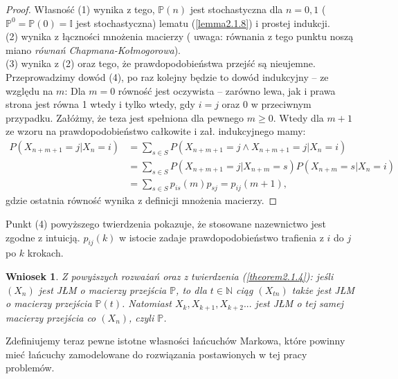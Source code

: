 \documentclass[a4paper]{article}
\theoremstyle{defn}
\theoremstyle{theorem}
\theoremstyle{lemma}
\theoremstyle{cor}
\newtheorem{cor}[defn]{Wniosek}
\theoremstyle{fact}
\begin{document}
\begin{proof}
Własność (1) wynika z tego, $\mathbb{P}(n)$ jest stochastyczna dla $n= 0,1$ ($\mathbb{P}^0 = \mathbb{P}(0) = \mathbb{I}$ jest stochastyczna) lematu (\ref{lemma2.1.8}) i prostej indukcji.
\\(2) wynika z łączności mnożenia macierzy ( uwaga: równania z tego punktu noszą miano \textit{równań Chapmana-Kołmogorowa}). \\
(3) wynika z (2) oraz tego, że prawdopodobieństwa przejść są nieujemne.\\
Przeprowadzimy dowód (4), po raz kolejny będzie to dowód indukcyjny – ze względu na $m$:
Dla $m=0$ równość jest oczywista – zarówno lewa, jak i prawa strona jest równa 1 wtedy i tylko wtedy, gdy $i = j$ oraz 0 w przeciwnym przypadku. Załóżmy, że teza jest spełniona dla pewnego $m \geq 0$. Wtedy dla $m+1$ ze wzoru na prawdopodobieństwo całkowite i zał. indukcyjnego mamy: \begin{align*}
    P(X_{n+m+1}=j|X_n = i) &= \sum\limits_{s \in S} P(X_{n+m+1}=j \land X_{n+m+1}=j |X_n = i) \\
    &= \sum\limits_{s \in S} P(X_{n+m+1}=j | X_{n+m}=s)P(X_{n+m}=s|X_n = i) \\
    &= \sum\limits_{s \in S} p_{is}(m)p_{sj} = p_{ij}(m+1),
\end{align*}
gdzie ostatnia równość wynika z definicji mnożenia macierzy.
\end{proof}
Punkt (4) powyższego twierdzenia pokazuje, że stosowane nazewnictwo jest zgodne z intuicją. $p_{ij}(k)$ w istocie zadaje prawdopodobieństwo trafienia z $i$ do $j$ po $k$ krokach.

\begin{cor}\label{cor2.1.14}
Z powyższych rozważań oraz z twierdzenia (\ref{theorem2.1.4}): jeśli $(X_n)$ jest JŁM o macierzy przejścia $\mathbb{P}$, to dla $t \in \mathbb{N}$ ciąg $(X_{tn})$ także jest JŁM o macierzy przejścia $\mathbb{P}(t)$. Natomiast $X_{k}, X_{k+1}, X_{k+2}...$ jest JŁM o tej samej macierzy przejścia co $(X_n)$, czyli $\mathbb{P}$.
\end{cor}

Zdefiniujemy teraz pewne istotne własności łańcuchów Markowa, które powinny mieć łańcuchy zamodelowane do rozwiązania postawionych w tej pracy problemów.
\end{document}

